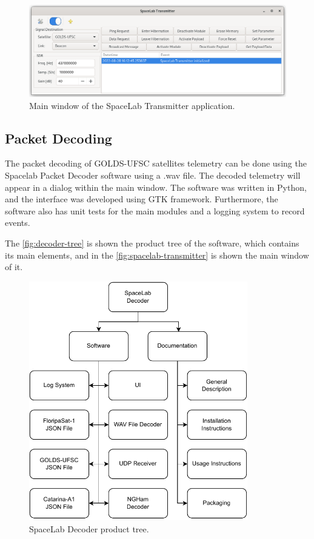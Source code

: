 \begin{figure}[!ht]
    \begin{center}
        \includegraphics[width=\textwidth]{figures/spacelab-transmitter-window.png}
        \caption{Main window of the SpaceLab Transmitter application.}
        \label{fig:spacelab-transmitter}
    \end{center}
\end{figure}

\subsection{Packet Decoding}
The packet decoding of GOLDS-UFSC satellites telemetry can be done using the Spacelab Packet Decoder software using a .wav file. The decoded telemetry will appear in a dialog within the main window. The software was written in Python, and the interface was developed using GTK framework. Furthermore, the software also has unit tests for the main modules and a logging system to record events. \cite{spacelab-decoder}

The \autoref{fig:decoder-tree} is shown the product tree of the software, which contains its main elements, and in the \autoref{fig:spacelab-transmitter} is shown the main window of it.

\begin{figure}[!ht]
    \begin{center}
        \includegraphics[width=270pt]{figures/decoder_tree.pdf}
        \caption{SpaceLab Decoder product tree.}
        \label{fig:decoder-tree}
    \end{center}
\end{figure}


